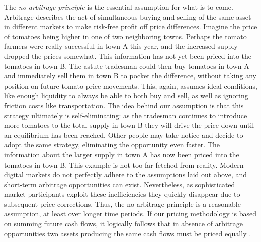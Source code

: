\documentclass[english,12pt,a4paper,pdftex,sci,utf8]{aaltothesis}
\begin{document}
The \emph{no-arbitrage principle} is the essential assumption for what is to come. Arbitrage describes the act of simultaneous buying and selling of the same asset in different markets to make risk-free profit off price differences. Imagine the price of tomatoes being higher in one of two neighboring towns. Perhaps the tomato farmers were really successful in town A this year, and the increased supply dropped the prices somewhat. This information has not yet been priced into the tomatoes in town B. The astute tradesman could then buy tomatoes in town A and immediately sell them in town B to pocket the difference, without taking any position on future tomato price movements. This, again, assumes ideal conditions, like enough liquidity to always be able to both buy and sell, as well as ignoring friction costs like transportation. The idea behind our assumption is that this strategy ultimately is self-eliminating: as the tradesman continues to introduce more tomatoes to the total supply in town B they will drive the price down until an equilibrium has been reached. Other people may take notice and decide to adopt the same strategy, eliminating the opportunity even faster. The information about the larger supply in town A has now been priced into the tomatoes in town B. This example is not too far-fetched from reality. Modern digital markets do not perfectly adhere to the assumptions laid out above, and short-term arbitrage opportunities can exist. Nevertheless, as sophisticated market participants exploit these inefficiencies they quickly disappear due to subsequent price corrections. Thus, the no-arbitrage principle is a reasonable assumption, at least over longer time periods. If our pricing methodology is based on summing future cash flows, it logically follows that in absence of arbitrage opportunities two assets producing the same cash flows must be priced equally \cite{hull2016options,wilmott2013paul}.
\end{document}
